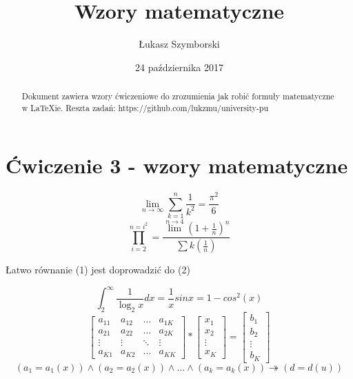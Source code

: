﻿\documentclass[a4paper,12pt]{article}
\title{Wzory matematyczne}
\author{Łukasz Szymborski}
\date{24 października 2017}
\begin{document}
\maketitle

\begin{abstract}
Dokument zawiera wzory ćwiczeniowe do zrozumienia jak robić formuły matematyczne w LaTeXie. Reszta zadań: https://github.com/lukzmu/university-pu 
\end{abstract}

\section{Ćwiczenie 3 - wzory matematyczne}

\begin{equation}
%
\lim_{n \to \infty}
\sum_{k=1}^n \frac{1}{k^2}
= \frac{\pi^2}{6} 
%
\end{equation}
\begin{equation}
%
\prod_{i=2}^{n=i^2}
= \frac{\lim^{n \to 4}(1+ \frac{1}{n})^n}{\sum k(\frac{1}{n})}
%
\end{equation}

Łatwo równanie (1) jest doprowadzić do (2)

\begin{equation}
%
\int_{2}^{\infty} \frac{1}{\log_{2}x}dx
= \frac{1}{x}sinx = 1 - cos^2(x)
%
\end{equation}
\begin{equation}
%
\left[ \begin{array}{cccc}
a_{11} & a_{12} & \ldots & a_{1K} \\
a_{21} & a_{22} & \ldots & a_{2K} \\
\vdots & \vdots & \ddots & \vdots \\
a_{K1} & a_{K2} & \ldots & a_{KK}
\end{array} \right] * 
\left[ \begin{array}{c}
x_{1} \\
x_{2} \\
\vdots \\
x_{K} 
\end{array} \right] =
\left[ \begin{array}{c}
b_{1} \\
b_{2} \\
\vdots \\
b_{K}
\end{array} \right]
%
\end{equation}
\begin{equation}
%
(a_{1}=a_{1}(x)) \wedge (a_{2}=a_{2}(x)) \wedge \ldots \wedge (a_{k}=a_{k}(x)) \twoheadrightarrow (d=d(u))
%
\end{equation}
\end{document}
